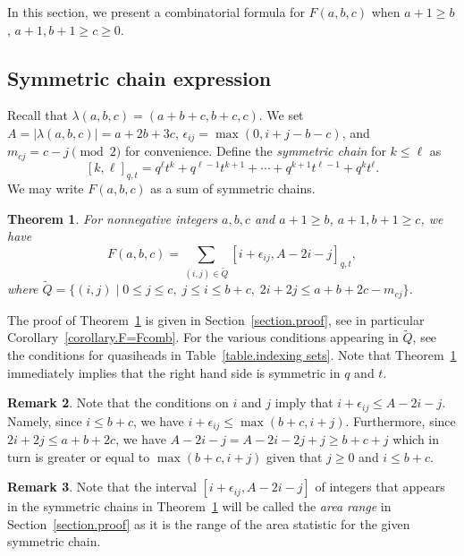 \documentclass[11pt,reqno]{amsart}
\newcommand{\defn}[1]{{\color{darkred}\emph{#1}}} %
\newtheorem{theorem}{Theorem}[section]
\theoremstyle{definition}
\newtheorem{remark}[theorem]{Remark}
\numberwithin{equation}{section}
\begin{document}
In this section, we present a combinatorial formula for $F(a,b,c)$ when
$a+1 \geqslant b$, $a+1,b+1 \geqslant c\geqslant 0$. 

\subsection{Symmetric chain expression}
\label{section.sc}

Recall that $\lambda(a,b,c) = (a+b+c,b+c,c)$. We set $A= |\lambda(a,b,c)| = a + 2b +3c$, $\epsilon_{ij} = \max(0,i+j-b-c)$,
and $m_{cj} = c-j \pmod{2}$ for convenience. Define the \defn{symmetric chain} for $k\leqslant \ell$ as
\[
	[k,\ell]_{q,t} = q^\ell t^k + q^{\ell-1} t^{k+1} + \cdots + q^{k+1} t^{\ell-1} + q^k t^\ell.
\] 
We may write $F(a,b,c)$ as a sum of symmetric chains.

\begin{theorem}
\label{theorem.symmetric chains}
For nonnegative integers $a,b,c$ and $a+1 \geqslant b$, $a+1,b+1 \geqslant c$, we have
\[
	F(a,b,c) = \sum_{(i,j) \in \widetilde{Q}} [i+ \epsilon_{ij}, A-2i-j]_{q,t},
\]
where $\widetilde{Q} = \{(i,j) \mid 0\leqslant j \leqslant c, \; j\leqslant i \leqslant b+c, \; 2i+2j \leqslant a+b+2c-m_{cj}\}$.
\end{theorem}

The proof of Theorem~\ref{theorem.symmetric chains} is given in Section~\ref{section.proof}, see in
particular Corollary~\ref{corollary.F=Fcomb}. For the various conditions appearing in $\widetilde{Q}$, see 
the conditions for quasiheads in Table~\ref{table.indexing sets}. Note that Theorem~\ref{theorem.symmetric chains}
immediately implies that the right hand side is symmetric in $q$ and $t$.

\begin{remark}
Note that the conditions on $i$ and $j$ imply that $i+\epsilon_{ij} \leqslant A-2i-j$. Namely, since $i \leqslant b+c$,
we have $i+\epsilon_{ij} \leqslant \max(b+c,i+j)$. Furthermore, since $2i+2j \leqslant a+b+2c$, we have
$A-2i-j = A-2i-2j+j \geqslant b+c+j$ which in turn is greater or equal to $\max(b+c,i+j)$ given that $j\geqslant 0$ and 
$i\leqslant b+c$.
\end{remark}

\begin{remark}
Note that the interval $[i+ \epsilon_{ij}, A-2i-j]$ of integers that appears in the 
symmetric chains in Theorem~\ref{theorem.symmetric chains} will be called the \defn{area range} in 
Section~\ref{section.proof} as it is the range of the area statistic for the given symmetric chain.
\end{remark}
\end{document}
